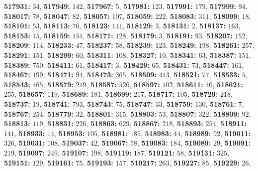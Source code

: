 \textsf{\bfseries 517931:} $34$, \textsf{\bfseries 517949:} $142$, \textsf{\bfseries 517967:} $5$, \textsf{\bfseries 517981:} $123$, \textsf{\bfseries 517991:} $179$, \textsf{\bfseries 517999:} $94$, \textsf{\bfseries 518017:} $78$, \textsf{\bfseries 518047:} $82$, \textsf{\bfseries 518057:} $107$, \textsf{\bfseries 518059:} $222$, \textsf{\bfseries 518083:} $311$, \textsf{\bfseries 518099:} $18$, \textsf{\bfseries 518101:} $53$, \textsf{\bfseries 518113:} $76$, \textsf{\bfseries 518123:} $141$, \textsf{\bfseries 518129:} $3$, \textsf{\bfseries 518131:} $2$, \textsf{\bfseries 518137:} $163$, \textsf{\bfseries 518153:} $45$, \textsf{\bfseries 518159:} $151$, \textsf{\bfseries 518171:} $128$, \textsf{\bfseries 518179:} $3$, \textsf{\bfseries 518191:} $93$, \textsf{\bfseries 518207:} $152$, \textsf{\bfseries 518209:} $114$, \textsf{\bfseries 518233:} $47$, \textsf{\bfseries 518237:} $58$, \textsf{\bfseries 518239:} $123$, \textsf{\bfseries 518249:} $198$, \textsf{\bfseries 518261:} $257$, \textsf{\bfseries 518291:} $151$, \textsf{\bfseries 518299:} $60$, \textsf{\bfseries 518311:} $108$, \textsf{\bfseries 518327:} $10$, \textsf{\bfseries 518341:} $63$, \textsf{\bfseries 518387:} $151$, \textsf{\bfseries 518389:} $750$, \textsf{\bfseries 518411:} $61$, \textsf{\bfseries 518417:} $3$, \textsf{\bfseries 518429:} $65$, \textsf{\bfseries 518431:} $73$, \textsf{\bfseries 518447:} $161$, \textsf{\bfseries 518467:} $199$, \textsf{\bfseries 518471:} $94$, \textsf{\bfseries 518473:} $365$, \textsf{\bfseries 518509:} $413$, \textsf{\bfseries 518521:} $77$, \textsf{\bfseries 518533:} $5$, \textsf{\bfseries 518543:} $465$, \textsf{\bfseries 518579:} $219$, \textsf{\bfseries 518587:} $526$, \textsf{\bfseries 518597:} $102$, \textsf{\bfseries 518611:} $40$, \textsf{\bfseries 518621:} $255$, \textsf{\bfseries 518657:} $119$, \textsf{\bfseries 518689:} $181$, \textsf{\bfseries 518699:} $217$, \textsf{\bfseries 518717:} $105$, \textsf{\bfseries 518729:} $218$, \textsf{\bfseries 518737:} $19$, \textsf{\bfseries 518741:} $793$, \textsf{\bfseries 518743:} $75$, \textsf{\bfseries 518747:} $33$, \textsf{\bfseries 518759:} $130$, \textsf{\bfseries 518761:} $7$, \textsf{\bfseries 518767:} $254$, \textsf{\bfseries 518779:} $32$, \textsf{\bfseries 518801:} $315$, \textsf{\bfseries 518803:} $53$, \textsf{\bfseries 518807:} $322$, \textsf{\bfseries 518809:} $92$, \textsf{\bfseries 518813:} $119$, \textsf{\bfseries 518831:} $226$, \textsf{\bfseries 518863:} $629$, \textsf{\bfseries 518867:} $218$, \textsf{\bfseries 518893:} $254$, \textsf{\bfseries 518911:} $141$, \textsf{\bfseries 518933:} $14$, \textsf{\bfseries 518953:} $105$, \textsf{\bfseries 518981:} $185$, \textsf{\bfseries 518983:} $44$, \textsf{\bfseries 518989:} $92$, \textsf{\bfseries 519011:} $326$, \textsf{\bfseries 519031:} $108$, \textsf{\bfseries 519037:} $42$, \textsf{\bfseries 519067:} $58$, \textsf{\bfseries 519083:} $184$, \textsf{\bfseries 519089:} $29$, \textsf{\bfseries 519091:} $219$, \textsf{\bfseries 519097:} $249$, \textsf{\bfseries 519107:} $198$, \textsf{\bfseries 519119:} $187$, \textsf{\bfseries 519121:} $58$, \textsf{\bfseries 519131:} $325$, \textsf{\bfseries 519151:} $129$, \textsf{\bfseries 519161:} $75$, \textsf{\bfseries 519193:} $157$, \textsf{\bfseries 519217:} $263$, \textsf{\bfseries 519227:} $85$, \textsf{\bfseries 519229:} $26$, 

